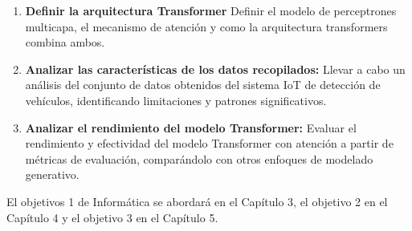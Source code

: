     \begin{enumerate}
        \item \textbf{Definir la arquitectura Transformer} 
        Definir el modelo de perceptrones multicapa, el mecanismo de atención y
        como la arquitectura transformers combina ambos.

        \item \textbf{Analizar las características de los datos recopilados:} 
        Llevar a cabo un análisis del conjunto de datos obtenidos del sistema
        IoT de detección de vehículos, identificando limitaciones y patrones
        significativos.
        
        \item \textbf{Analizar el rendimiento del modelo Transformer:} 
        Evaluar el rendimiento y efectividad del modelo Transformer con atención
        a partir de métricas de evaluación, comparándolo con otros enfoques de
        modelado generativo.
        
    \end{enumerate}
    
El objetivos 1 de Informática se abordará en el Capítulo 3, el objetivo 2 en el Capítulo 4 y el objetivo 3 en el
Capítulo 5. 